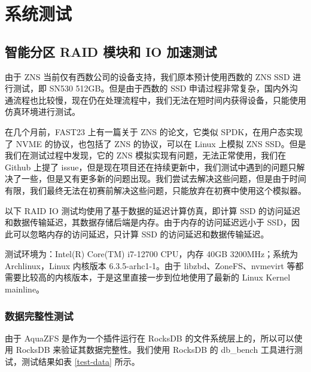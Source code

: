 \section{系统测试}

\subsection{智能分区 RAID 模块和 IO 加速测试}

由于 ZNS 当前仅有西数公司的设备支持，我们原本预计使用西数的 ZNS SSD 进行测试，即 SN530 512GB。但是由于西数的 SSD 申请过程非常复杂，国内外沟通流程也比较慢，现在仍在处理流程中，我们无法在短时间内获得设备，只能使用仿真环境进行测试。

在几个月前，FAST23 上有一篇关于 ZNS 的论文，它类似 SPDK，在用户态实现了 NVME 的协议，也包括了 ZNS 的协议，可以在 Linux 上模拟 ZNS SSD。但是我们在测试过程中发现，它的 ZNS 模拟实现有问题，无法正常使用，我们在 Github 上提了 issue，但是现在项目还在持续更新中，我们测试中遇到的问题只解决了一些，但是又有更多新的问题出现。我们尝试去解决这些问题，但是由于时间有限，我们最终无法在初赛前解决这些问题，只能放弃在初赛中使用这个模拟器。

以下 RAID IO 测试均使用了基于数据的延迟计算仿真，即计算 SSD 的访问延迟和数据传输延迟，其数据存储后端是内存。由于内存的访问延迟远小于 SSD，因此可以忽略内存的访问延迟，只计算 SSD 的访问延迟和数据传输延迟。

测试环境为：Intel(R) Core(TM) i7-12700 CPU，内存 40GB 3200MHz；系统为 Archlinux，Linux 内核版本 6.3.5-arhc1-1。由于 libzbd、ZoneFS、nvmevirt 等都需要比较高的内核版本，于是这里直接一步到位地使用了最新的 Linux Kernel mainline。

\subsubsection{数据完整性测试}

由于 AquaZFS 是作为一个插件运行在 RocksDB 的文件系统层上的，所以可以使用 RocksDB 来验证其数据完整性。我们使用 RocksDB 的 db\_bench 工具进行测试，测试结果如表 \ref{test-data} 所示。

